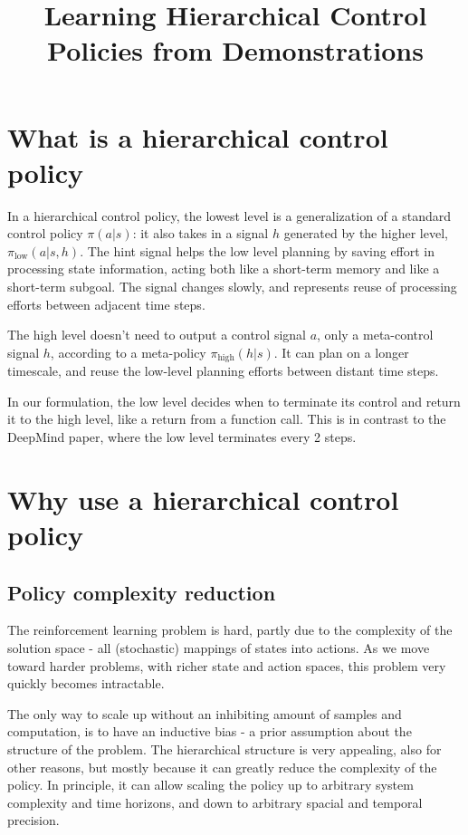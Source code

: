


\title{Learning Hierarchical Control Policies from Demonstrations}
\date{}



\maketitle

\section{What is a hierarchical control policy}

In a hierarchical control policy, the lowest level is a generalization of a standard control policy $\pi(a|s)$: it also takes in a signal $h$ generated by the higher level, $\pi_{\text{low}}(a|s,h)$.
The hint signal helps the low level planning by saving effort in processing state information, acting both like a short-term memory and like a short-term subgoal.
The signal changes slowly, and represents reuse of processing efforts between adjacent time steps.

The high level doesn't need to output a control signal $a$, only a meta-control signal $h$, according to a meta-policy $\pi_{\text{high}}(h|s)$.
It can plan on a longer timescale, and reuse the low-level planning efforts between distant time steps.

In our formulation, the low level decides when to terminate its control and return it to the high level, like a return from a function call.
This is in contrast to the DeepMind paper, where the low level terminates every 2 steps.

\section{Why use a hierarchical control policy}

\subsection{Policy complexity reduction}

The reinforcement learning problem is hard, partly due to the complexity of the solution space - all (stochastic) mappings of states into actions.
As we move toward harder problems, with richer state and action spaces, this problem very quickly becomes intractable.

The only way to scale up without an inhibiting amount of samples and computation, is to have an inductive bias - a prior assumption about the structure of the problem.
The hierarchical structure is very appealing, also for other reasons, but mostly because it can greatly reduce the complexity of the policy.
In principle, it can allow scaling the policy up to arbitrary system complexity and time horizons, and down to arbitrary spacial and temporal precision.

